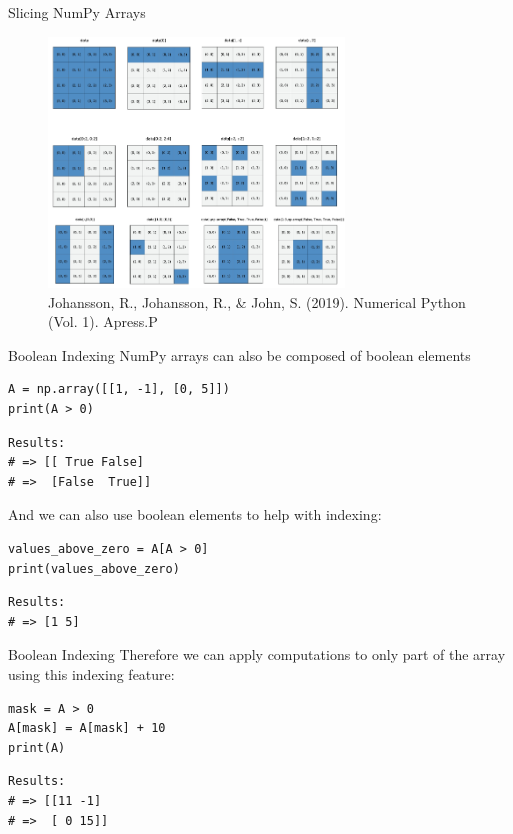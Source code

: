 \documentclass[10pt]{beamer}
\begin{document}
\begin{frame}[label={sec:org51afc88}]{Slicing NumPy Arrays}
\begin{figure}[htbp]
\centering
\includegraphics[width=0.7\textwidth]{./images/indexing.png}
\caption{Johansson, R., Johansson, R., \& John, S. (2019). Numerical Python (Vol. 1). Apress.P}
\end{figure}
\end{frame}

\begin{frame}[label={sec:org7b08e4d},fragile]{Boolean Indexing}
 NumPy arrays can also be composed of boolean elements

\begin{verbatim}
A = np.array([[1, -1], [0, 5]])
print(A > 0)
\end{verbatim}

\begin{verbatim}
Results: 
# => [[ True False]
# =>  [False  True]]
\end{verbatim}


And we can also use boolean elements to help with indexing:

\begin{verbatim}
values_above_zero = A[A > 0]
print(values_above_zero)
\end{verbatim}

\begin{verbatim}
Results: 
# => [1 5]
\end{verbatim}
\end{frame}

\begin{frame}[label={sec:orgb46f53c},fragile]{Boolean Indexing}
 Therefore we can apply computations to only part of the array using this indexing
feature:

\begin{verbatim}
mask = A > 0
A[mask] = A[mask] + 10
print(A)
\end{verbatim}

\begin{verbatim}
Results: 
# => [[11 -1]
# =>  [ 0 15]]
\end{verbatim}
\end{frame}
\end{document}
